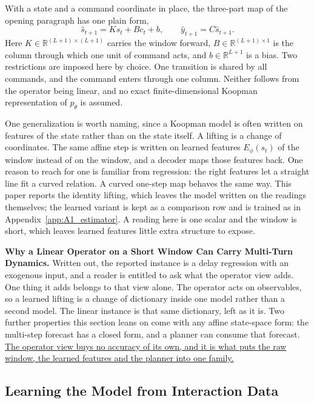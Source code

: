 With a state and a command coordinate in place, the three-part map of the
opening paragraph has one plain form,
\begin{equation}
    \widehat{s}_{t+1}
    =
    K s_t+B c_t+b,
    \qquad
    \widehat{y}_{t+1}
    =
    C\widehat{s}_{t+1}.
    \label{eq:koopman_model}
\end{equation}
Here $K\in\mathbb{R}^{(L+1)\times(L+1)}$ carries the window forward,
$B\in\mathbb{R}^{(L+1)\times 1}$ is the column through which one unit of
command acts, and $b\in\mathbb{R}^{L+1}$ is a bias. Two restrictions are imposed
here by choice. One transition is shared by all commands, and the command
enters through one column. Neither follows from the operator being linear, and
no exact finite-dimensional Koopman representation of $p_{\theta}$ is assumed.

One generalization is worth naming, since a Koopman model is often written on
features of the state rather than on the state itself. A lifting is a change of
coordinates. The same affine step is written on learned features
$E_{\phi}(s_t)$ of the window instead of on the window, and a decoder maps
those features back. One reason to reach
for one is familiar from regression: the right features let a straight line
fit a curved relation. A curved one-step map behaves the same way. This
paper reports the identity lifting, which leaves the model written on the
readings themselves; the learned variant is kept as a comparison row and is
trained as in Appendix~\ref{app:A1_estimator}. A reading here is one scalar
and the window is short, which leaves learned features little extra structure
to expose.

\textbf{Why a Linear Operator on a Short Window Can Carry Multi-Turn
Dynamics.} Written out, the reported instance is a delay regression with an
exogenous input, and a reader is entitled to ask what the operator view adds.
One thing it adds belongs to that view alone. The operator acts on
observables, so a learned lifting is a change of dictionary inside one model
rather than a second model. The linear instance is that same dictionary, left
as it is. Two further properties this section leans on come with any affine
state-space form: the multi-step forecast has a closed form, and a planner can
consume that forecast. \uline{The operator view buys no accuracy of its own,
and it is what puts the raw window, the learned features and the planner into
one family.}

\subsection{Learning the Model from Interaction Data}
\label{sec:learning}

